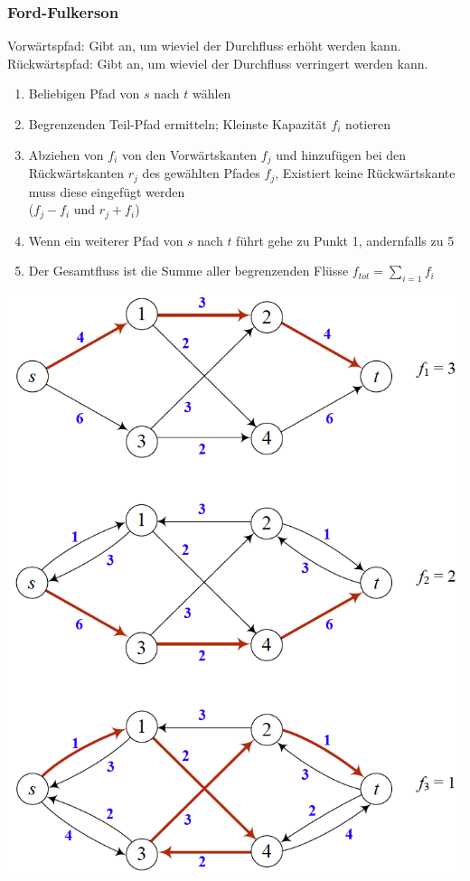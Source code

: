 \subsubsection{Ford-Fulkerson}
\begin{minipage}{0.7\textwidth}
Vorwärtspfad: Gibt an, um wieviel der Durchfluss erhöht werden kann.\\
Rückwärtspfad: Gibt an, um wieviel der Durchfluss verringert werden kann.
	\begin{enumerate}
		\item Beliebigen Pfad von $s$ nach $t$ wählen
		\item Begrenzenden Teil-Pfad ermitteln; Kleinste Kapazität $f_i$ notieren
		\item Abziehen von $f_i$ von den Vorwärtskanten $f_j$ und hinzufügen bei den Rückwärtskanten $r_j$ des gewählten Pfades $f_j$, Existiert keine Rückwärtskante muss diese eingefügt werden\\ ($f_j-f_i$ und $r_j + f_i$)
		\item Wenn ein weiterer Pfad von $s$ nach $t$ führt gehe zu  Punkt 1, andernfalls zu 5
		\item Der Gesamtfluss ist die Summe aller begrenzenden Flüsse $f_{tot} = \sum_{i=1} f_i$
	\end{enumerate}
\end{minipage}
\begin{minipage}{0.3\textwidth}
	\includegraphics[width=\textwidth]{Content/Graphen/FordFulkerson.png}
\end{minipage}



